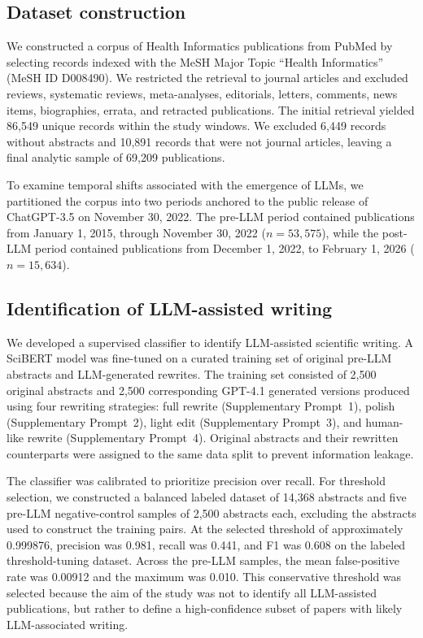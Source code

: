 
\subsection*{Dataset construction}

We constructed a corpus of Health Informatics publications from PubMed by selecting records indexed with the MeSH Major Topic ``Health Informatics'' (MeSH ID D008490). We restricted the retrieval to journal articles and excluded reviews, systematic reviews, meta-analyses, editorials, letters, comments, news items, biographies, errata, and retracted publications. The initial retrieval yielded 86,549 unique records within the study windows. We excluded 6,449 records without abstracts and 10,891 records that were not journal articles, leaving a final analytic sample of 69,209 publications.

To examine temporal shifts associated with the emergence of LLMs, we partitioned the corpus into two periods anchored to the public release of ChatGPT-3.5\cite{openai2022chatgpt} on November 30, 2022. 
The pre-LLM period contained publications from January 1, 2015, through November 30, 2022 ($n=53,575$), while the post-LLM period contained publications from December 1, 2022, to February 1, 2026 ($n=15,634$).

\subsection*{Identification of LLM-assisted writing}

We developed a supervised classifier to identify LLM-assisted scientific writing.
A SciBERT model\cite{beltagy-etal-2019-scibert}  was fine-tuned on a curated training set of original pre-LLM abstracts and LLM-generated rewrites. The training set consisted of 2,500 original abstracts and 2,500 corresponding GPT-4.1\cite{openai2025gpt41} generated versions produced using four rewriting strategies: full rewrite (Supplementary Prompt~1), polish (Supplementary Prompt~2), light edit (Supplementary Prompt~3), and human-like rewrite (Supplementary Prompt~4). Original abstracts and their rewritten counterparts were assigned to the same data split to prevent information leakage.

The classifier was calibrated to prioritize precision over recall. For threshold selection, we constructed  a balanced labeled dataset of 14,368 abstracts and five pre-LLM negative-control samples of 2,500 abstracts each, excluding the abstracts used to construct the training pairs. At the selected threshold of approximately 0.999876, precision was 0.981, recall was 0.441, and F1 was 0.608 on the labeled threshold-tuning dataset. Across the pre-LLM samples, the mean false-positive rate was 0.00912 and the maximum was 0.010. 
This conservative threshold was selected because the aim of the study was not to identify all LLM-assisted publications, but rather to define a high-confidence subset of papers with likely LLM-associated writing. 

